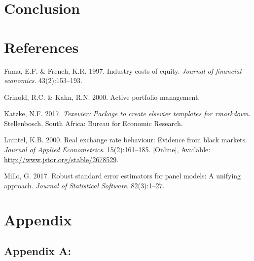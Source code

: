 \documentclass[11pt,preprint, authoryear]{elsarticle}
\numberwithin{equation}{section}
\numberwithin{figure}{section}
\numberwithin{table}{section}
\newlength{\cslhangindent}
\newenvironment{CSLReferences}%
  {\setlength{\parindent}{0pt}%
  \everypar{\setlength{\hangindent}{\cslhangindent}}\ignorespaces}%
  {\par}
\begin{document}
\hypertarget{conclusion}{%
\section{Conclusion}\label{conclusion}}

\newpage

\hypertarget{references}{%
\section*{References}\label{references}}

\hypertarget{refs}{}
\begin{CSLReferences}{1}{0}
\leavevmode\hypertarget{ref-fama1997}{}%
Fama, E.F. \& French, K.R. 1997. Industry costs of equity. \emph{Journal
of financial economics}. 43(2):153--193.

\leavevmode\hypertarget{ref-grinold2000}{}%
Grinold, R.C. \& Kahn, R.N. 2000. Active portfolio management.

\leavevmode\hypertarget{ref-Texevier}{}%
Katzke, N.F. 2017. \emph{{Texevier}: {P}ackage to create elsevier
templates for rmarkdown}. Stellenbosch, South Africa: Bureau for
Economic Research.

\leavevmode\hypertarget{ref-Kul}{}%
Luintel, K.B. 2000. Real exchange rate behaviour: Evidence from black
markets. \emph{Journal of Applied Econometrics}. 15(2):161--185.
{[}Online{]}, Available: \url{http://www.jstor.org/stable/2678529}.

\leavevmode\hypertarget{ref-plm}{}%
Millo, G. 2017. Robust standard error estimators for panel models: A
unifying approach. \emph{Journal of Statistical Software}. 82(3):1--27.

\end{CSLReferences}

\newpage

\hypertarget{appendix}{%
\section*{Appendix}\label{appendix}}

\hypertarget{appendix-a}{%
\subsection*{\texorpdfstring{Appendix A:
\label{A}}{Appendix A: }}\label{appendix-a}}
\end{document}
